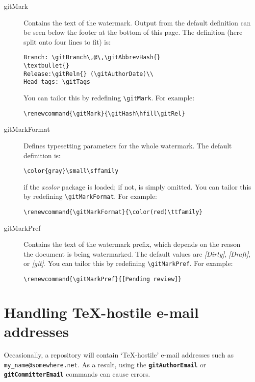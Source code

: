 \documentclass[a4paper,12pt,twoside,openany]{memoir}
\newcommand{\dark}[1]{\texttt\textbf{{#1}}}
\newcommand{\sfit}[1]{\textit{#1}}
\begin{document}
\begin{description}

\item[gitMark]
    Contains the text of the watermark.
    Output from the default definition can be seen
    below the footer
    at the bottom of this page.
    The definition
    (here split onto four lines to fit)
    is:

\begin{verbatim}
Branch: \gitBranch\,@\,\gitAbbrevHash{}
\textbullet{}
Release:\gitReln{} (\gitAuthorDate)\\
Head tags: \gitTags
\end{verbatim}
You can tailor this by redefining \verb!\gitMark!.
For example:

\begin{verbatim}
\renewcommand{\gitMark}{\gitHash\hfill\gitRel}
\end{verbatim}

\item[gitMarkFormat]
    Defines typesetting parameters for the whole watermark.
    The default definition is:

\begin{verbatim}
\color{gray}\small\sffamily
\end{verbatim}
if the \sfit{xcolor} package is loaded; if not, \verb!! is simply omitted.
You can tailor this by redefining \verb!\gitMarkFormat!. For example:

\begin{verbatim}
\renewcommand{\gitMarkFormat}{\color(red)\ttfamily}
\end{verbatim}

\item[gitMarkPref]
    Contains the text of the watermark prefix,
    which depends on the reason the document is being watermarked.
    The default values are \sfit{[Dirty]}, \sfit{[Draft]}, or \sfit{[git]}.
    You can tailor this by redefining \verb!\gitMarkPref!. For example:

\begin{verbatim}
\renewcommand{\gitMarkPref}{[Pending review]}
\end{verbatim}

\end{description}

\clearpage
\section{Handling \TeX-hostile e-mail addresses}
\label{sect:emailuser}
Occasionally, a repository will contain `\TeX-hostile'
e-mail addresses such as \verb!my_name@somewhere.net!.
As a result, using the \dark{gitAuthorEmail}
or \dark{gitCommitterEmail} commands can cause errors.
\end{document}
